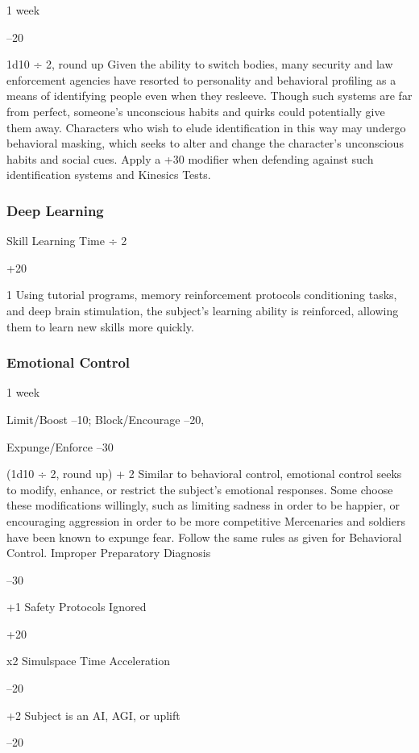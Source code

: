 1 week

–20

1d10 ÷ 2, round up
Given the ability to switch bodies, many security and 
law enforcement agencies have resorted to personality
and behavioral profiling as a means of identifying
people even when they resleeve. Though such systems 
are far from perfect, someone's unconscious habits 
and quirks could potentially give them away. Characters
who wish to elude identification in this way may
undergo behavioral masking, which seeks to alter and 
change the character's unconscious habits and social 
cues. Apply a +30 modifier when defending against 
such identification systems and Kinesics Tests.

\subsubsection{Deep Learning}


Skill Learning Time ÷ 2

+20

1
Using tutorial programs, memory reinforcement protocols
conditioning tasks, and deep brain stimulation,
the subject's learning ability is reinforced, allowing 
them to learn new skills more quickly.

\subsubsection{Emotional Control}


1 week

Limit/Boost –10; Block/Encourage –20, 

Expunge/Enforce –30

(1d10 ÷ 2, round up) + 2
Similar to behavioral control, emotional control seeks 
to modify, enhance, or restrict the subject's emotional 
responses. Some choose these modifications willingly, 
such as limiting sadness in order to be happier, or 
encouraging aggression in order to be more competitive
Mercenaries and soldiers have been known
to expunge fear. Follow the same rules as given for 
Behavioral Control.
Improper Preparatory Diagnosis

–30

+1
Safety Protocols Ignored

+20

x2
Simulspace Time Acceleration

–20

+2
Subject is an AI, AGI, or uplift             

–20

